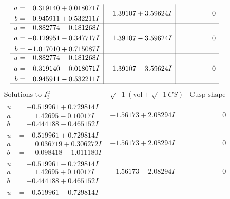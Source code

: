 \documentclass[1p]{elsarticle_modified}
\theoremstyle{definition}
\newcommand{\I}{\sqrt{-1}}
\begin{document}
$$\begin{array}{c|c|c}
\begin{aligned}
a &= \phantom{-}0.319140 + 0.018071 I \\
b &= \phantom{-}0.945911 + 0.532211 I\end{aligned}
 & \phantom{-}1.39107 + 3.59624 I & \phantom{-0.000000 } 0 \\ \hline\begin{aligned}
u &= \phantom{-}0.882774 - 0.181268 I \\
a &= -0.129951 - 0.347717 I \\
b &= -1.017010 + 0.715087 I\end{aligned}
 & \phantom{-}1.39107 - 3.59624 I & \phantom{-0.000000 } 0 \\ \hline\begin{aligned}
u &= \phantom{-}0.882774 - 0.181268 I \\
a &= \phantom{-}0.319140 - 0.018071 I \\
b &= \phantom{-}0.945911 - 0.532211 I\end{aligned}
 & \phantom{-}1.39107 - 3.59624 I & \phantom{-0.000000 } 0\\
 \hline 
 \end{array}$$\newpage$$\begin{array}{c|c|c}  
\text{Solutions to }I^u_{3}& \I (\text{vol} + \sqrt{-1}CS) & \text{Cusp shape}\\
 \hline 
\begin{aligned}
u &= -0.519961 + 0.729814 I \\
a &= \phantom{-}1.42695 - 0.10017 I \\
b &= -0.444188 - 0.465152 I\end{aligned}
 & -1.56173 + 2.08294 I & \phantom{-0.000000 } 0 \\ \hline\begin{aligned}
u &= -0.519961 + 0.729814 I \\
a &= \phantom{-}0.036719 + 0.306272 I \\
b &= \phantom{-}0.098418 - 1.011180 I\end{aligned}
 & -1.56173 + 2.08294 I & \phantom{-0.000000 } 0 \\ \hline\begin{aligned}
u &= -0.519961 - 0.729814 I \\
a &= \phantom{-}1.42695 + 0.10017 I \\
b &= -0.444188 + 0.465152 I\end{aligned}
 & -1.56173 - 2.08294 I & \phantom{-0.000000 } 0 \\ \hline\begin{aligned}
u &= -0.519961 - 0.729814 I \\

\end{aligned}
\end{array}$$
\end{document}
